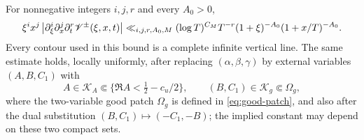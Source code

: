 \begin{lemma}\label{lem:double-weight}
For nonnegative integers $i,j,r$ and every $A_0>0$,
\begin{equation}\label{eq:double-weight-bound}
 \xi^i x^j
 \left|\partial_\xi^i\partial_x^j\partial_t^r
 \mathscr V^\pm(\xi,x,t)\right|
 \ll_{i,j,r,A_0,M}
 (\log T)^{C_M}T^{-r}(1+\xi)^{-A_0}(1+x/T)^{-A_0}.
\end{equation}
Every contour used in this bound is a complete infinite vertical line.
The same estimate holds, locally uniformly, after replacing
$(\alpha,\beta,\gamma)$ by external variables $(A,B,C_1)$ with
\[
 A\in\mathscr K_A\Subset\{\Re A<\tfrac12-c_u/2\},
 \qquad (B,C_1)\in\mathscr K_g\Subset\Omega_g,
\]
where the two-variable good patch $\Omega_g$ is defined in
\eqref{eq:good-patch},
and also after the dual substitution $(B,C_1)\mapsto(-C_1,-B)$; the implied
constant may depend on these two compact sets.
\end{lemma}

